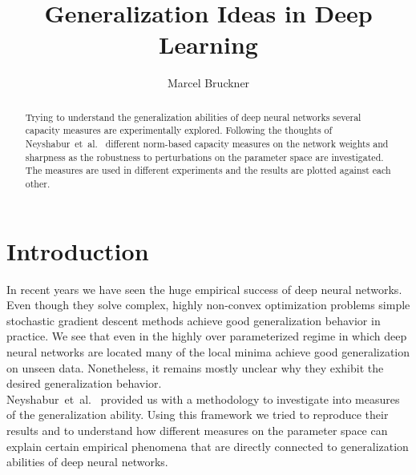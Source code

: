 \documentclass[a4paper,10pt]{article}
\title{Generalization Ideas in Deep Learning} %
\author{Marcel Bruckner} %
\institute{\textit{Seminar: Optimization and Generalization in Deep Learning}}
\newcommand{\ns}{Neyshabur~et~al.~\cite{neyshabur2017exploring}}
\begin{document}
\maketitle

\begin{abstract}
Trying to understand the generalization abilities of deep neural networks several capacity measures are experimentally explored. Following the thoughts of \ns{} different norm-based capacity measures on the network weights and sharpness as the robustness to perturbations on the parameter space are investigated. The measures are used in different experiments and the results are plotted against each other.
\end{abstract}

\section{Introduction}
In recent years we have seen the huge empirical success of deep neural networks. Even though they solve complex, highly non-convex optimization problems simple stochastic gradient descent methods achieve good generalization behavior in practice. We see that even in the highly over parameterized regime in which deep neural networks are located many of the local minima achieve good generalization on unseen data. Nonetheless, it remains mostly unclear why they exhibit the desired generalization behavior.\\
%
\ns{} provided us with a methodology to investigate into measures of the generalization ability. Using this framework we tried to reproduce their results and to understand how different measures on the parameter space can explain certain empirical phenomena that are directly connected to generalization abilities of deep neural networks.
%






\newpage



\newpage

\nocite{*}



\end{document}
